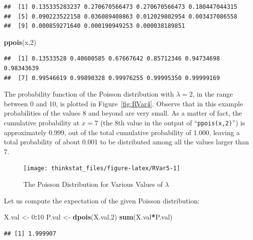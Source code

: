 \documentclass[]{krantz}
\makeatletter
\newenvironment{Shaded}{\begin{snugshade}}{\end{snugshade}}
\newcommand{\KeywordTok}[1]{\textcolor[rgb]{0.13,0.29,0.53}{\textbf{#1}}}
\newcommand{\DecValTok}[1]{\textcolor[rgb]{0.00,0.00,0.81}{#1}}
\newcommand{\StringTok}[1]{\textcolor[rgb]{0.31,0.60,0.02}{#1}}
\newcommand{\OperatorTok}[1]{\textcolor[rgb]{0.81,0.36,0.00}{\textbf{#1}}}
\newcommand{\NormalTok}[1]{#1}
\newenvironment{kframe}{%
\medskip{}
\setlength{\fboxsep}{.8em}
 \def\at@end@of@kframe{}%
 \ifinner\ifhmode%
  \def\at@end@of@kframe{\end{minipage}}%
  \begin{minipage}{\columnwidth}%
 \fi\fi%
 \def\FrameCommand##1{\hskip\@totalleftmargin \hskip-\fboxsep
 \colorbox{shadecolor}{##1}\hskip-\fboxsep
     \hskip-\linewidth \hskip-\@totalleftmargin \hskip\columnwidth}%
 \MakeFramed {\advance\hsize-\width
   \@totalleftmargin\z@ \linewidth\hsize
   \@setminipage}}%
 {\par\unskip\endMakeFramed%
 \at@end@of@kframe}
\renewenvironment{Shaded}{\begin{kframe}}{\end{kframe}}
\theoremstyle{definition}
\theoremstyle{definition}
\theoremstyle{definition}
\theoremstyle{remark}
\makeatother
\begin{document}
\begin{verbatim}
##  [1] 0.135335283237 0.270670566473 0.270670566473 0.180447044315
##  [5] 0.090223522158 0.036089408863 0.012029802954 0.003437086558
##  [9] 0.000859271640 0.000190949253 0.000038189851
\end{verbatim}

\begin{Shaded}
\begin{Highlighting}[]
\KeywordTok{ppois}\NormalTok{(x,}\DecValTok{2}\NormalTok{)}
\end{Highlighting}
\end{Shaded}

\begin{verbatim}
##  [1] 0.13533528 0.40600585 0.67667642 0.85712346 0.94734698 0.98343639
##  [7] 0.99546619 0.99890328 0.99976255 0.99995350 0.99999169
\end{verbatim}

The probability function of the Poisson distribution with
\(\lambda = 2\), in the range between 0 and 10, is plotted in
Figure~\ref{fig:RVar4}. Observe that in this example probabilities of
the values 8 and beyond are very small. As a matter of fact, the
cumulative probability at \(x=7\) (the 8th value in the output of
``\texttt{ppois(x,2)}'') is approximately 0.999, out of the total
cumulative probability of 1.000, leaving a total probability of about
0.001 to be distributed among all the values larger than 7.

\begin{figure}

{\centering \texttt{[image: thinkstat\_files/figure-latex/RVar5-1]} 

}

\caption{The Poisson Distribution for Various Values of $\lambda$}\label{fig:RVar5}
\end{figure}

Let us compute the expectation of the given Poisson distribution:

\begin{Shaded}
\begin{Highlighting}[]
\NormalTok{X.val <-}\StringTok{ }\DecValTok{0}\OperatorTok{:}\DecValTok{10}
\NormalTok{P.val <-}\StringTok{ }\KeywordTok{dpois}\NormalTok{(X.val,}\DecValTok{2}\NormalTok{)}
\KeywordTok{sum}\NormalTok{(X.val}\OperatorTok{*}\NormalTok{P.val)}
\end{Highlighting}
\end{Shaded}

\begin{verbatim}
## [1] 1.999907
\end{verbatim}
\end{document}
